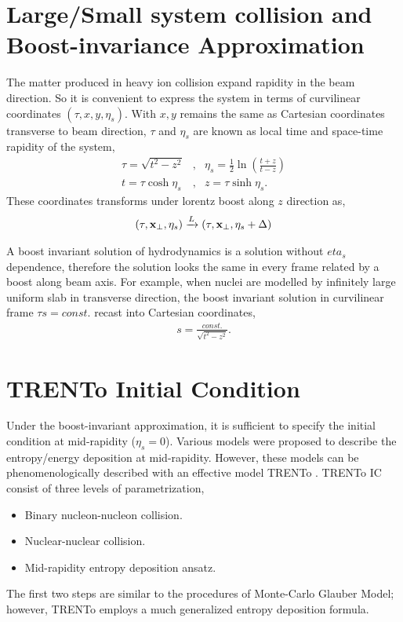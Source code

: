 \documentclass[aps,prl,twocolumn,groupedaddress]{revtex4-1}
\begin{document}
\section{Large/Small system collision and Boost-invariance Approximation}
	The matter produced in heavy ion collision expand rapidity in the beam direction. So it is convenient to express the system in terms of curvilinear coordinates $(\tau, x, y, \eta_s)$. 
	With $x, y$ remains the same as Cartesian coordinates transverse to beam direction, $\tau$ and $\eta_s$ are known as local time and space-time rapidity of the system,
	\begin{eqnarray}
		\tau = \sqrt{t^2 - z^2} &,& \eta_s = \frac{1}{2}\ln\left(\frac{t+z}{t-z}\right) \\
		t = \tau \cosh \eta_s &,& z = \tau \sinh \eta_s.
	\end{eqnarray}
	These coordinates transforms under lorentz boost along $z$ direction as,
	\begin{eqnarray}
		(\tau, {\bf x_{\perp}}, \eta_s) \xrightarrow{L} (\tau, {\bf x_{\perp}}, \eta_s + \Delta)
	\end{eqnarray}
	
	A boost invariant solution of hydrodynamics is a solution without $eta_s$ dependence, therefore the solution looks the same in every frame related by a boost along beam axis. 
	For example, when nuclei are modelled by infinitely large uniform slab in transverse direction, the boost invariant solution in curvilinear frame $\tau s = const.$ recast into Cartesian coordinates,
	\begin{eqnarray}
		s = \frac{const.}{\sqrt{t^2 - z^2}}.
	\end{eqnarray}
	
	\section{TRENTo Initial Condition}
	Under the boost-invariant approximation, it is sufficient to specify the initial condition at mid-rapidity ($\eta_s = 0$). Various models were proposed to describe the entropy/energy deposition at mid-rapidity. 
	However, these models can be phenomenologically described with an effective model TRENTo \cite{Moreland:2014oya}. 
	TRENTo IC consist of three levels of parametrization,
	\begin{itemize}
		\item Binary nucleon-nucleon collision.
		\item Nuclear-nuclear collision.
		\item Mid-rapidity entropy deposition ansatz.
	\end{itemize}
	The first two steps are similar to the procedures of Monte-Carlo Glauber Model; however, TRENTo employs a much generalized entropy deposition formula.
\end{document}
